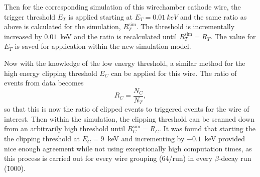Then for the corresponding simulation of this wirechamber cathode wire, the trigger threshold $E_T$
is applied starting at $E_T=0.01~keV$ and the same ratio as above is calculated for the simulation,
$R^{\mathrm{sim}}_{T}$. The
threshold is incrementally increased by $0.01$~keV and the ratio is recalculated until
$R^{\mathrm{sim}}_{T} = R_T$. The value for $E_T$ is saved for application within the new simulation
model.

Now with the knowledge of the low energy threshold, a similar method for the high energy clipping
threshold $E_C$ can be applied for this wire. The ratio of events from data becomes
\begin{equation}
  R_{C} = \frac{N_C}{N_{T}},
\end{equation}
so that this is now the ratio of clipped events to triggered events for the wire of interest.
Then within the simulation, the clipping threshold can be scanned down from an arbitrarily high
threshold until $R^{\mathrm{sim}}_{C} = R_C$. It was found that starting the 
the clipping threshold at $E_C=9$~keV and incrementing by $-0.1$~keV provided nice enough
agreement while not using exceptionally high computation times, as this process is carried out
for every wire grouping (64/run) in every $\beta$-decay run (\~1000).

